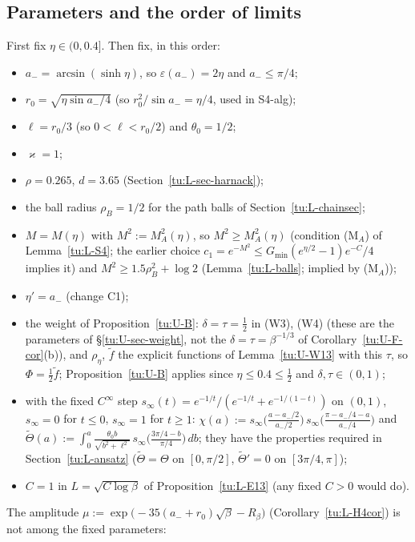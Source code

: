 \subsection{Parameters and the order of limits}
First fix $\eta\in(0,0.4]$. Then fix, in this order:
\begin{itemize}
\item $a_-=\arcsin(\sinh\eta)$, so $\varepsilon(a_-)=2\eta$ and $a_-\le\pi/4$;
\item $r_0=\sqrt{\eta\sin a_-/4}$ (so $r_0^2/\sin a_-=\eta/4$, used in S4-alg);
\item $\ell=r_0/3$ (so $0<\ell<r_0/2$) and $\theta_0=1/2$;
\item $\varkappa=1$;
\item $\rho=0.265$, $d=3.65$ (Section~\ref{tu:L-sec-harnack});
\item the ball radius $\rho_B=1/2$ for the path balls of Section~\ref{tu:L-chainsec};
\item $M=M(\eta)$ with $M^2:=M_A^2(\eta)$, so $M^2\ge M_A^2(\eta)$ (condition (M$_A$) of Lemma~\ref{tu:L-S4}; the earlier choice $c_1=e^{-M^2}\le G_{\min}(e^{\eta/2}-1)e^{-C}/4$ implies it) and $M^2\ge1.5\rho_B^2+\log2$ (Lemma~\ref{tu:L-balls}; implied by (M$_A$));
\item $\eta'=a_-$ (change C1);
\item the weight of Proposition~\ref{tu:U-B}: $\delta=\tau=\frac12$ in (W3), (W4) (these are the parameters of
\S\ref{tu:U-sec-weight}, not the $\delta=\tau=\beta^{-1/3}$ of Corollary~\ref{tu:U-F-cor}(b)), and $\rho_\eta$, $\tilde f$ the explicit
functions of Lemma~\ref{tu:U-W13} with this $\tau$, so $\Phi=\frac12\tilde f$; Proposition~\ref{tu:U-B} applies since
$\eta\le0.4\le\frac12$ and $\delta,\tau\in(0,1)$;
\item with the fixed $C^\infty$ step $s_\infty(t)=e^{-1/t}/(e^{-1/t}+e^{-1/(1-t)})$ on $(0,1)$, $s_\infty=0$ for $t\le0$,
$s_\infty=1$ for $t\ge1$:
$\chi(a):=s_\infty\big(\frac{a-a_-/2}{a_-/2}\big)\,s_\infty\big(\frac{\pi-a_-/4-a}{a_-/4}\big)$ and
$\tilde\Theta(a):=\int_0^a\frac{\theta_0b}{\sqrt{b^2+\ell^2}}\,s_\infty\big(\frac{3\pi/4-b}{\pi/4}\big)\,db$; they have the properties
required in Section~\ref{tu:L-ansatz} ($\tilde\Theta=\Theta$ on $[0,\pi/2]$, $\tilde\Theta'=0$ on $[3\pi/4,\pi]$);
\item $C=1$ in $L=\sqrt{C\log\beta}$ of Proposition~\ref{tu:L-E13} (any fixed $C>0$ would do).
\end{itemize}
The amplitude $\mu:=\exp\big(-35(a_-+r_0)\sqrt\beta-R_\beta\big)$ (Corollary~\ref{tu:L-H4cor}) is not among the fixed parameters:
